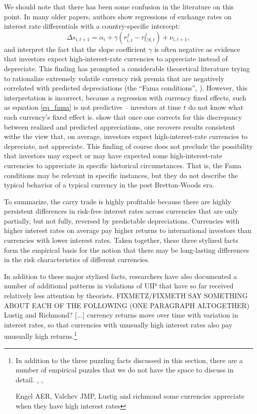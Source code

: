 \documentclass{ar-1col}
\begin{document}
We should note that there has been some confusion in the literature on this point. In many older papers, authors show regressions of exchange rates on interest rate differentials with a country-specific intercept:
\begin{equation}
    \Delta s_{i,t+1} 
    = \alpha_i + \gamma \left(r^f_{i, t} - r^f_{US, t}\right) + \nu_{i, t+1},
\label{eq_fama} 
\end{equation}
and interpret the fact that the slope coefficient $\gamma$ is often negative as evidence that investors expect high-interest-rate currencies to appreciate instead of depreciate. This finding has prompted a considerable theoretical literature trying to rationalize extremely volatile currency risk premia that are negatively correlated with predicted depreciations (the ``Fama conditions'', \citet{Backusetal2001}). However, this interpretation is incorrect, because a regression with currency fixed effects, such as equation \eqref{eq_fama} is not predictive -- investors at time $t$ do not know what each currency's fixed effect is. \citet{HassanMano2015} show that once one corrects for this discrepancy between realized and predicted appreciations, one recovers results consistent withe the view that, on average, investors expect high-interest-rate currencies to depreciate, not appreciate. This finding of course does not preclude the possibility that investors may expect or may have expected some high-interest-rate currencies to appreciate in specific historical circumstances. That is, the Fama conditions may be relevant in specific instances, but they do not describe the typical behavior of a typical currency in the post Bretton-Woods era.

To summarize, the carry trade is highly profitable because there are highly persistent differences in risk-free interest rates across currencies that are only partially, but not fully, reversed by predictable depreciations. Currencies with higher interest rates on average pay higher returns to international investors than currencies with lower interest rates. Taken together, these three stylized facts form the empirical basis for the notion that there may be long-lasting differences in the risk characteristics of different currencies.

In addition to these major stylized facts, researchers have also documented a number of additional patterns in violations of UIP that have so far received relatively less attention by theorists. FIXMETZ/FIXMETH SAY SOMETHING ABOUT EACH OF THE FOLLOWING (ONE PARAGRAPH ALTOGETHER) \citet{ChinnMeredith2004} \citet{LRV2014} \citet{LustigStathopoulosVerdelhan2019} Lustig and Richmond? [...] currency returns move over time with variation in interest rates, so that currencies with unusually high interest rates also pay unusually high returns.\footnote{In addition to the three puzzling facts discussed in this section, there are a number of empirical puzzles that we do not have the space to discuss in detail. \citet{LRV2014}, \citet{ChinnMeredith2004}, \citet{LustigStathopoulosVerdelhan2019} \citet{}

  Engel AER, Valchev JMP, Lustig and richmond some currencies appreciate when they have high interest rates}
\end{document}
